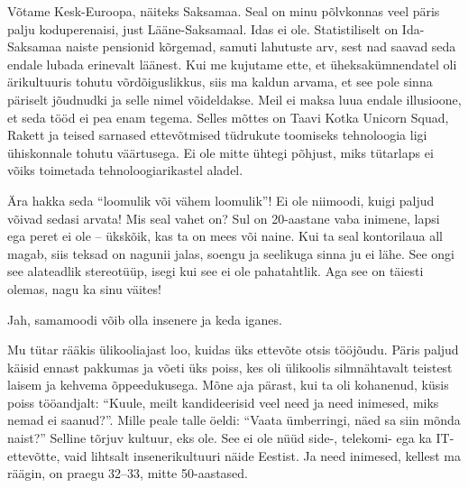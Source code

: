 
Võtame Kesk-Euroopa, näiteks Saksamaa. Seal on
minu põlvkonnas veel päris palju koduperenaisi, just Lääne-Saksamaal. 
Idas ei ole. Statistiliselt on Ida-Saksamaa naiste 
pensionid kõrgemad, samuti lahutuste arv, sest nad saavad 
seda endale lubada erinevalt läänest. Kui me kujutame ette, et 
üheksakümnendatel oli ärikultuuris tohutu võrdõiguslikkus, siis ma kaldun arvama, 
et see pole sinna päriselt jõudnudki ja selle nimel võideldakse. Meil ei maksa luua endale illusioone, 
et seda tööd ei pea enam tegema. Selles mõttes on Taavi Kotka Unicorn Squad, Rakett ja teised sarnased ettevõtmised tüdrukute 
toomiseks tehnoloogia ligi ühiskonnale tohutu väärtusega. Ei 
ole mitte ühtegi põhjust, miks tütarlaps ei võiks toimetada tehnoloogiarikastel 
aladel.


Ära hakka seda \enquote{loomulik või vähem loomulik}! Ei ole niimoodi, kuigi paljud võivad sedasi arvata! Mis seal vahet on? Sul 
on 20-aastane vaba inimene, lapsi ega peret ei ole -- ükskõik, kas ta on mees või naine. Kui 
ta seal kontorilaua all magab, siis teksad on nagunii jalas, soengu ja 
seelikuga sinna ju ei lähe. See ongi see alateadlik stereotüüp, isegi kui see ei ole pahatahtlik. Aga see on täiesti olemas, nagu ka sinu 
väites!


Jah, samamoodi võib olla insenere ja keda iganes.


Mu tütar rääkis ülikooliajast loo, kuidas üks ettevõte otsis tööjõudu. 
Päris paljud käisid ennast pakkumas ja võeti üks poiss, kes oli ülikoolis 
silmnähtavalt teistest laisem ja kehvema õppeedukusega. Mõne aja pärast, kui ta oli kohanenud, küsis poiss
tööandjalt: \enquote{Kuule, meilt kandideerisid veel need ja 
need inimesed, miks nemad ei saanud?}. Mille peale talle öeldi: 
\enquote{Vaata ümberringi, näed sa siin mõnda naist?} Selline tõrjuv kultuur, 
eks ole. See ei ole nüüd side-, telekomi- ega ka IT-ettevõtte, vaid lihtsalt insenerikultuuri näide Eestist. Ja need inimesed, 
kellest ma räägin, on praegu 32--33, mitte 50-aastased.

